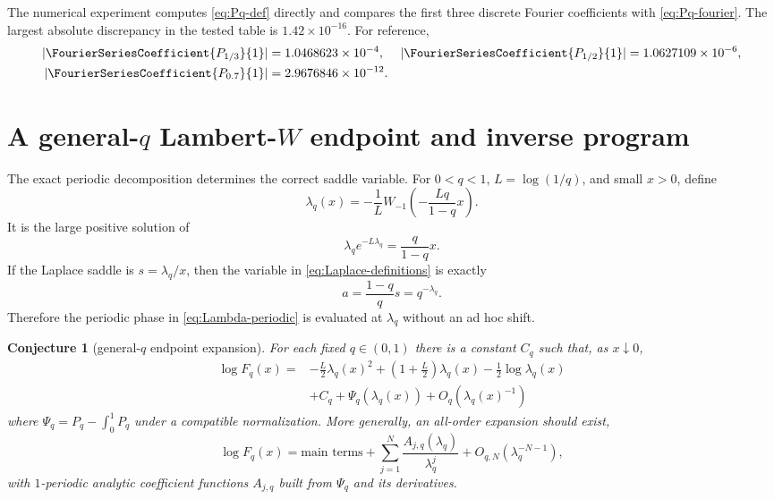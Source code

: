 \documentclass[11pt,oneside]{article}
\newtheorem{conjecture}[theorem]{Conjecture}
\theoremstyle{definition}
\theoremstyle{remark}
\begin{document}
The numerical experiment computes \cref{eq:Pq-def} directly and compares the first three discrete Fourier coefficients with \cref{eq:Pq-fourier}.  The largest absolute discrepancy in the tested table is $1.42\times10^{-16}$.  For reference,
\[
\begin{aligned}
 |\FourierSeriesCoefficient{P_{1/3}}{1}|&=1.0468623\times10^{-4},&
 |\FourierSeriesCoefficient{P_{1/2}}{1}|&=1.0627109\times10^{-6},\\
 |\FourierSeriesCoefficient{P_{0.7}}{1}|&=2.9676846\times10^{-12}.&&
\end{aligned}
\]

\section{A general-$q$ Lambert-$W$ endpoint and inverse program}
\label{sec:general-q-endpoint}

The exact periodic decomposition determines the correct saddle variable.  For $0<q<1$, $L=\log(1/q)$, and small $x>0$, define
\begin{equation}\label{eq:lambda-q}
 \lambda_q(x)=-\frac1L
 W_{-1}\!\left(-\frac{Lq}{1-q}x\right).
\end{equation}
It is the large positive solution of
\begin{equation}\label{eq:lambda-relation}
 \lambda_qe^{-L\lambda_q}=\frac{q}{1-q}x.
\end{equation}
If the Laplace saddle is $s=\lambda_q/x$, then the variable in \cref{eq:Laplace-definitions} is exactly
\[
 a=\frac{1-q}{q}s=q^{-\lambda_q}.
\]
Therefore the periodic phase in \cref{eq:Lambda-periodic} is evaluated at $\lambda_q$ without an ad hoc shift.

\begin{conjecture}[general-$q$ endpoint expansion]\label{conj:general-q-endpoint}
For each fixed $q\in(0,1)$ there is a constant $C_q$ such that, as $x\downarrow0$,
\begin{equation}\label{eq:general-q-endpoint}
 \boxed{\begin{aligned}
 \log F_q(x)={}&-\frac L2\lambda_q(x)^2
 +\left(1+\frac L2\right)\lambda_q(x)
 -\frac12\log\lambda_q(x)\\
 &+C_q+\Psi_q(\lambda_q(x))
 +O_q(\lambda_q(x)^{-1})
 \end{aligned}}
\end{equation}
where $\Psi_q=P_q-\int_0^1P_q$ under a compatible normalization.  More generally, an all-order expansion should exist,
\begin{equation}\label{eq:all-order-endpoint}
 \log F_q(x)=\text{main terms}
 +\sum_{j=1}^N\frac{A_{j,q}(\lambda_q)}{\lambda_q^j}
 +O_{q,N}(\lambda_q^{-N-1}),
\end{equation}
with $1$-periodic analytic coefficient functions $A_{j,q}$ built from $\Psi_q$ and its derivatives.
\end{conjecture}
\end{document}

